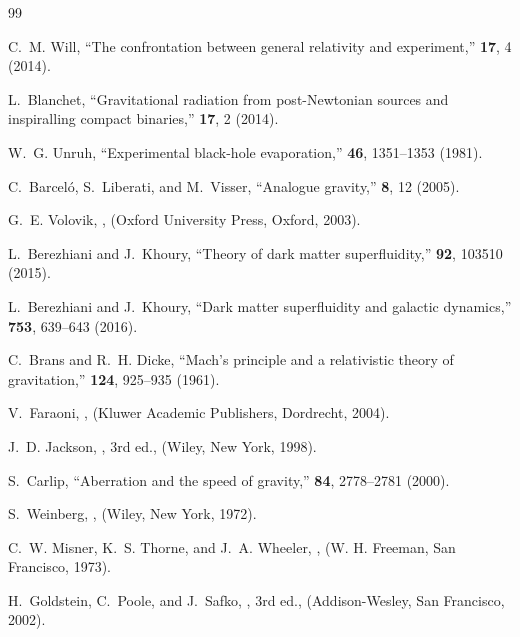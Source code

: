 \documentclass[11pt]{article}
\begin{document}
\begin{thebibliography}{99}

C.~M. Will,
\newblock ``The confrontation between general relativity and experiment,''
 {\bf 17}, 4 (2014).

L.~Blanchet,
\newblock ``Gravitational radiation from post-Newtonian sources and inspiralling compact binaries,''
 {\bf 17}, 2 (2014).

W.~G. Unruh,
\newblock ``Experimental black-hole evaporation,''
 {\bf 46}, 1351--1353 (1981).

C.~Barceló, S.~Liberati, and M.~Visser,
\newblock ``Analogue gravity,''
 {\bf 8}, 12 (2005).

G.~E. Volovik,
,
\newblock (Oxford University Press, Oxford, 2003).

L.~Berezhiani and J.~Khoury,
\newblock ``Theory of dark matter superfluidity,''
 {\bf 92}, 103510 (2015).

L.~Berezhiani and J.~Khoury,
\newblock ``Dark matter superfluidity and galactic dynamics,''
 {\bf 753}, 639--643 (2016).

C.~Brans and R.~H. Dicke,
\newblock ``Mach's principle and a relativistic theory of gravitation,''
 {\bf 124}, 925--935 (1961).

V.~Faraoni,
,
\newblock (Kluwer Academic Publishers, Dordrecht, 2004).

J.~D. Jackson,
, 3rd ed.,
\newblock (Wiley, New York, 1998).

S.~Carlip,
\newblock ``Aberration and the speed of gravity,''
 {\bf 84}, 2778--2781 (2000).

S.~Weinberg,
,
\newblock (Wiley, New York, 1972).

C.~W. Misner, K.~S. Thorne, and J.~A. Wheeler,
,
\newblock (W. H. Freeman, San Francisco, 1973).

H.~Goldstein, C.~Poole, and J.~Safko,
, 3rd ed.,
\newblock (Addison-Wesley, San Francisco, 2002).

\end{thebibliography}
\end{document}
